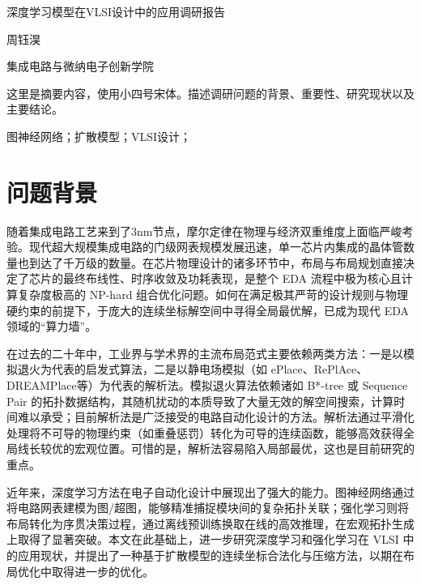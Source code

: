 \documentclass[12pt, a4paper]{article}
\newcommand{\sanhao}{\fontsize{16pt}{24pt}\selectfont} %
\newcommand{\sihao}{\fontsize{14pt}{21pt}\selectfont}   %
\newcommand{\xiaosi}{\fontsize{12pt}{18pt}\selectfont} %
\begin{document}
\begin{center}
    {\sanhao\heiti 深度学习模型在VLSI设计中的应用调研报告} \\ %
    \vspace{1\baselineskip}
    
    {\sihao\fangsong 周钰淏} \\ %
    \vspace{0.5\baselineskip}
    
    {\xiaosi\songti 集成电路与微纳电子创新学院} \\ %
    \vspace{1\baselineskip}
\end{center}

\noindent {\xiaosi\heiti 摘要：} {\xiaosi\songti 这里是摘要内容，使用小四号宋体。描述调研问题的背景、重要性、研究现状以及主要结论。} 
\vspace{1\baselineskip}

\noindent {\xiaosi\heiti 关键词：} {\xiaosi\songti 图神经网络；扩散模型；VLSI设计；} %
\vspace{1\baselineskip}

\section{问题背景}
随着集成电路工艺来到了3nm节点，摩尔定律在物理与经济双重维度上面临严峻考验。现代超大规模集成电路的门级网表规模发展迅速，单一芯片内集成的晶体管数量也到达了千万级的数量。在芯片物理设计的诸多环节中，布局与布局规划直接决定了芯片的最终布线性、时序收敛及功耗表现，是整个 EDA 流程中极为核心且计算复杂度极高的 NP-hard 组合优化问题。如何在满足极其严苛的设计规则与物理硬约束的前提下，于庞大的连续坐标解空间中寻得全局最优解，已成为现代 EDA 领域的“算力墙”。

在过去的二十年中，工业界与学术界的主流布局范式主要依赖两类方法：一是以模拟退火为代表的启发式算法，二是以静电场模拟（如 ePlace、RePlAce、DREAMPlace等）为代表的解析法。模拟退火算法依赖诸如 B*-tree 或 Sequence Pair 的拓扑数据结构，其随机扰动的本质导致了大量无效的解空间搜索，计算时间难以承受；目前解析法是广泛接受的电路自动化设计的方法。解析法通过平滑化处理将不可导的物理约束（如重叠惩罚）转化为可导的连续函数，能够高效获得全局线长较优的宏观位置。可惜的是，解析法容易陷入局部最优，这也是目前研究的重点。

近年来，深度学习方法在电子自动化设计中展现出了强大的能力。图神经网络通过将电路网表建模为图/超图，能够精准捕捉模块间的复杂拓扑关联；强化学习则将布局转化为序贯决策过程，通过离线预训练换取在线的高效推理，在宏观拓扑生成上取得了显著突破。本文在此基础上，进一步研究深度学习和强化学习在 VLSI 中的应用现状，并提出了一种基于扩散模型的连续坐标合法化与压缩方法，以期在布局优化中取得进一步的优化。
\end{document}
